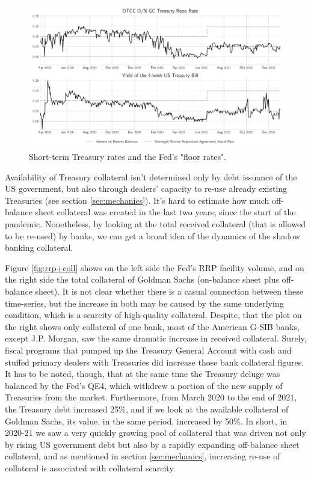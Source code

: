 \documentclass[11pt,a4paper,english,oneside]{article}
\begin{document}
\begin{figure}[htb!]
  \begin{center}
    \caption{Short-term Treasury rates and the Fed's "floor rates".}
    \label{fig:rates}
    \includegraphics[width=0.99\linewidth]{rates.pdf}
  \end{center}
\end{figure}

Availability of Treasury collateral isn't determined only by debt issuance of the US government, but also through dealers' capacity to re-use already existing Treasuries (see section \ref{sec:mechanics}). It's hard to estimate how much off-balance sheet collateral was created in the last two years, since the start of the pandemic. Nonetheless, by looking at the total received collateral (that is allowed to be re-used) by banks, we can get a broad idea of the dynamics of the shadow banking collateral.

Figure \ref{fig:rrp+coll} shows on the left side the Fed's RRP facility volume, and on the right side the total collateral of Goldman Sachs (on-balance sheet plus off-balance sheet). It is not clear whether there is a casual connection between these time-series, but the increase in both may be caused by the same underlying condition, which is a scarcity of high-quality collateral. Despite, that the plot on the right shows only collateral of one bank, most of the American G-SIB  banks, except J.P. Morgan, saw the same dramatic increase in received collateral. Surely, fiscal programs that pumped up the Treasury General Account with cash and stuffed primary dealers with Treasuries did increase those bank collateral figures. It has to be noted, though, that at the same time the Treasury deluge was balanced by the Fed's QE4, which withdrew a portion of the new supply of Treasuries from the market. Furthermore, from March 2020 to the end of 2021, the Treasury debt increased 25\%, and if we look at the available collateral of Goldman Sachs, its value, in the same period, increased by 50\%. In short, in 2020-21 we saw a very quickly growing pool of collateral that was driven not only by rising US government debt but also by a rapidly expanding off-balance sheet collateral, and as mentioned in section \ref{sec:mechanics}, increasing re-use of collateral is associated with collateral scarcity.
\end{document}
